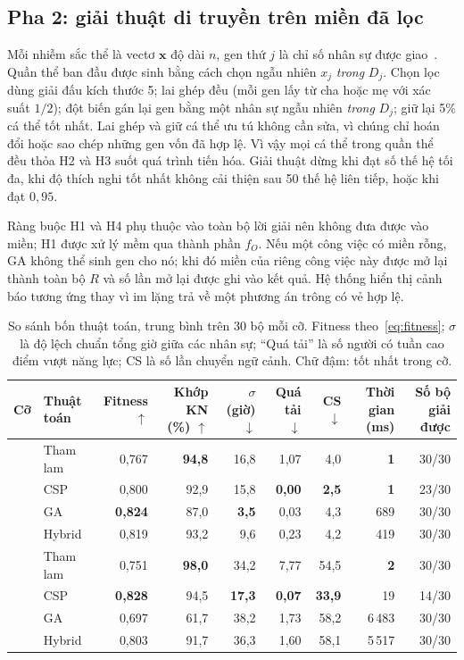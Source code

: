 \documentclass{IEEEtran}
\begin{document}
\subsection{Pha 2: giải thuật di truyền trên miền đã lọc}

Mỗi nhiễm sắc thể là vectơ $\mathbf{x}$ độ dài $n$, gen thứ $j$ là chỉ số nhân sự được giao~\cite{chu1997}. Quần thể ban đầu được sinh bằng cách chọn ngẫu nhiên $x_j$ \emph{trong} $D_j$. Chọn lọc dùng giải đấu kích thước 5; lai ghép đều (mỗi gen lấy từ cha hoặc mẹ với xác suất $1/2$); đột biến gán lại gen bằng một nhân sự ngẫu nhiên \emph{trong} $D_j$; giữ lại 5\% cá thể tốt nhất. Lai ghép và giữ cá thể ưu tú không cần sửa, vì chúng chỉ hoán đổi hoặc sao chép những gen vốn đã hợp lệ. Vì vậy mọi cá thể trong quần thể đều thỏa H2 và H3 suốt quá trình tiến hóa. Giải thuật dừng khi đạt số thế hệ tối đa, khi độ thích nghi tốt nhất không cải thiện sau 50 thế hệ liên tiếp, hoặc khi đạt $0{,}95$.

Ràng buộc H1 và H4 phụ thuộc vào toàn bộ lời giải nên không đưa được vào miền; H1 được xử lý mềm qua thành phần $f_O$. Nếu một công việc có miền rỗng, GA không thể sinh gen cho nó; khi đó miền của riêng công việc này được mở lại thành toàn bộ $R$ và số lần mở lại được ghi vào kết quả. Hệ thống hiển thị cảnh báo tương ứng thay vì im lặng trả về một phương án trông có vẻ hợp lệ.

\begin{table}[!t]
\centering
\caption{So sánh bốn thuật toán, trung bình trên 30 bộ mỗi cỡ. Fitness theo~\eqref{eq:fitness}; $\sigma$ là độ lệch chuẩn tổng giờ giữa các nhân sự; ``Quá tải'' là số người có tuần cao điểm vượt năng lực; CS là số lần chuyển ngữ cảnh. Chữ đậm: tốt nhất trong cỡ.}
\label{tab:main}
\begin{tabular}{llrrrrrrr}
\toprule
Cỡ & Thuật toán & Fitness $\uparrow$ & Khớp KN (\%) $\uparrow$ & $\sigma$ (giờ) $\downarrow$ & Quá tải $\downarrow$ & CS $\downarrow$ & Thời gian (ms) & Số bộ giải được \\
\midrule
{}
 & Tham lam & 0,767 & \textbf{94,8} & 16,8 & 1,07 & 4,0 & \textbf{1} & 30/30 \\
 & CSP      & 0,800 & 92,9 & 15,8 & \textbf{0,00} & \textbf{2,5} & \textbf{1} & 23/30 \\
 & GA       & \textbf{0,824} & 87,0 & \textbf{3,5} & 0,03 & 4,3 & 689 & 30/30 \\
 & Hybrid   & 0,819 & 93,2 & 9,6 & 0,23 & 4,2 & 419 & 30/30 \\
\midrule
{}
 & Tham lam & 0,751 & \textbf{98,0} & 34,2 & 7,77 & 54,5 & \textbf{2} & 30/30 \\
 & CSP      & \textbf{0,828} & 94,5 & \textbf{17,3} & \textbf{0,07} & \textbf{33,9} & 19 & 14/30 \\
 & GA       & 0,697 & 61,7 & 38,2 & 1,73 & 58,2 & 6\,483 & 30/30 \\
 & Hybrid   & 0,803 & 91,7 & 36,3 & 1,60 & 58,1 & 5\,517 & 30/30 \\
\bottomrule
\end{tabular}
\end{table}
\end{document}
